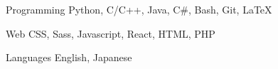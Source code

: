 

\begin{cvskills}

  \cvskill
    {Programming} %
    {Python, C/C++, Java, C\#, Bash, Git, LaTeX} %

  \cvskill
    {Web} %
    {CSS, Sass, Javascript, React, HTML, PHP} %

  \cvskill
    {Languages} %
    {English, Japanese} %

\end{cvskills}
